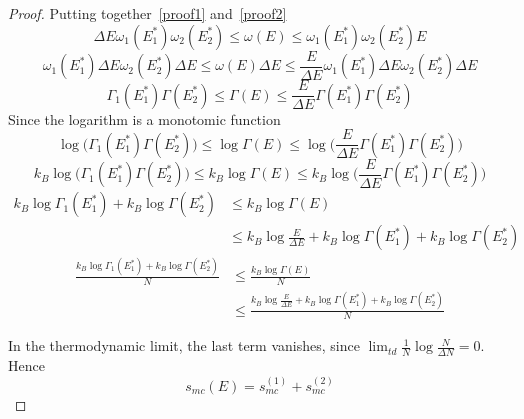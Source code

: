 \begin{proof}
        Putting together~\eqref{proof1} and~\eqref{proof2}
        \begin{equation*}
            \Delta E \omega_1(E^*_1) \omega_2(E^*_2) \leq \omega(E) \leq \omega_1(E^*_1) \omega_2(E^*_2) E
        \end{equation*}
        \begin{equation*}
            \omega_1(E^*_1) \Delta E \omega_2(E^*_2) \Delta E \leq \omega(E) \Delta E \leq \frac{E}{\Delta E} \omega_1(E^*_1) \Delta E \omega_2(E^*_2) \Delta E
        \end{equation*}
        \begin{equation*}
            \Gamma_1(E^*_1) \Gamma(E^*_2) \leq \Gamma(E) \leq \frac{E}{\Delta E}\Gamma(E^*_1) \Gamma(E^*_2)
        \end{equation*}
        Since the logarithm is a monotomic function
        \begin{equation*}
            \log \Big ( \Gamma_1(E^*_1) \Gamma(E^*_2) \Big ) \leq \log \Gamma(E) \leq \log \Big ( \frac{E}{\Delta E}\Gamma(E^*_1) \Gamma(E^*_2) \Big )
        \end{equation*}
        \begin{equation*}
            k_B \log \Big ( \Gamma_1(E^*_1) \Gamma(E^*_2) \Big ) \leq k_B \log \Gamma(E) \leq k_B \log \Big ( \frac{E}{\Delta E}\Gamma(E^*_1) \Gamma(E^*_2) \Big )
        \end{equation*}
        \begin{equation*}
        \begin{aligned}
            k_B \log \Gamma_1(E^*_1) + k_B \log \Gamma(E^*_2) & \leq k_B \log \Gamma(E) \\ & \leq k_B \log \frac{E}{\Delta E} + k_B \log \Gamma(E^*_1) + k_B \log \Gamma(E^*_2)
        \end{aligned}
        \end{equation*}
        \begin{equation*}
        \begin{aligned}
            \frac{k_B \log \Gamma_1(E^*_1) + k_B \log \Gamma(E^*_2)}{N} & \leq \frac{k_B \log \Gamma(E)}{N} \\ & \leq \frac{k_B \log \frac{E}{\Delta E} + k_B \log \Gamma(E^*_1) + k_B \log \Gamma(E^*_2)}{N}
        \end{aligned}
        \end{equation*}

        In the thermodynamic limit, the last term vanishes, since $\lim_{td} \frac{1}{N} \log \frac{N}{\Delta N} = 0$. Hence 
        \begin{equation*}
            s_{mc}(E) = s_{mc}^{(1)} + s_{mc}^{(2)}
        \end{equation*}
 
    \end{proof}

